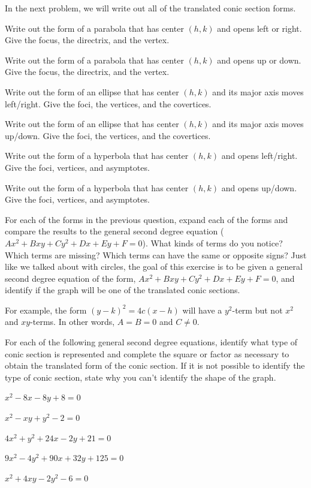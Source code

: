 \eq
In the next problem, we will write out all of the translated conic section forms.
\bq \be
\item Write out the form of a parabola that has center $(h,k)$ and opens left or right. Give the focus, the directrix, and the vertex.
\item Write out the form of a parabola that has center $(h,k)$ and opens up or down. Give the focus, the directrix, and the vertex.
\item Write out the form of an ellipse that has center $(h,k)$ and its major axis moves left/right. Give the foci, the vertices, and the covertices.
\item Write out the form of an ellipse that has center $(h,k)$ and its major axis moves up/down. Give the foci, the vertices, and the covertices.
\item Write out the form of a hyperbola that has center $(h,k)$ and opens left/right. Give the foci, vertices, and asymptotes.
\item Write out the form of a hyperbola that has center $(h,k)$ and opens up/down. Give the foci, vertices, and asymptotes.
\ee
\eq

\bq For each of the forms in the previous question, expand each of the forms  and compare the results to the general second degree equation ($Ax^2+Bxy+Cy^2+Dx+Ey+F=0$). What kinds of terms do you notice? Which terms are missing? Which terms can have the same or opposite signs? Just like we talked about with circles, the goal of this exercise is to be given a general second degree equation of the form, $Ax^2+Bxy+Cy^2+Dx+Ey+F=0$, and identify if the graph will be one of the translated conic sections.

For example, the form $(y-k)^2=4c(x-h)$ will have a $y^2$-term but not $x^2$ and $xy$-terms. In other words, $A=B=0$ and $C\neq 0$. \eq

\bq For each of the following general second degree equations, identify what type of conic section is represented and complete the square or factor as necessary to obtain the translated form of the conic section. If it is not possible to identify the type of conic section, state why you can't identify the shape of the graph.
\be
\item $x^2-8x-8y+8=0$
\item $x^2-xy+y^2-2=0$
\item $4x^2+y^2+24x-2y+21=0$
\item $9x^2-4y^2+90x+32y+125=0$
\item $x^2+4xy-2y^2-6=0$
\ee
\eq

